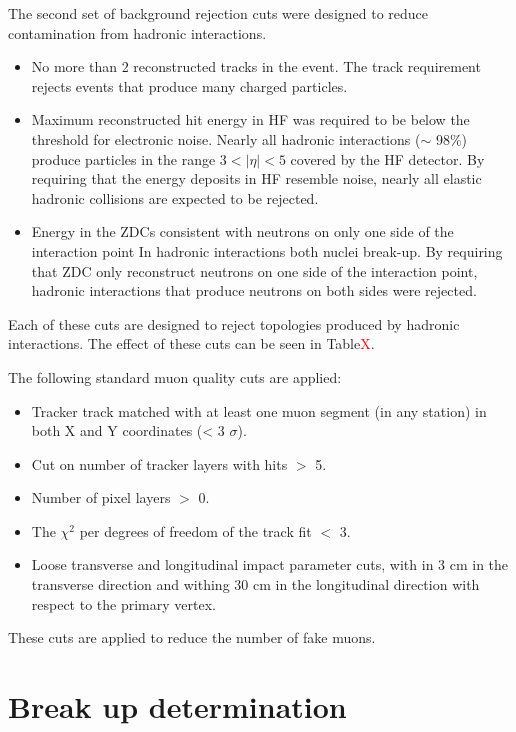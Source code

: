       The second set of background rejection cuts were designed to 
        reduce contamination from hadronic interactions. 
      \begin{itemize}
  	    \item No more than 2 reconstructed tracks in the event.
          The track requirement rejects events that produce many charged 
          particles.
  	    \item Maximum reconstructed hit energy in HF was required to be below 
            the threshold for electronic noise. 
          Nearly all hadronic interactions ($\sim$ 98\%) produce particles in the 
            range $3<|\eta|<5$ covered by the HF detector.
          By requiring that the energy deposits in HF resemble noise, nearly all
            elastic hadronic collisions are expected to be rejected.
  	    \item Energy in the ZDCs consistent with neutrons on only one side 
            of the interaction point
          In hadronic interactions both nuclei break-up. 
          By requiring that ZDC only reconstruct neutrons on one side of the 
            interaction point, hadronic interactions that produce neutrons on both 
            sides were rejected.
      \end{itemize}
      Each of these cuts are designed to reject topologies produced by hadronic
        interactions.
      The effect of these cuts can be seen in Table\textcolor{red}{X}.
  
      The following standard muon quality cuts are applied:
      \begin{itemize}
        \item Tracker track matched with at least one muon segment 
          (in any station) in both X and Y coordinates (< 3 $\sigma$).
        \item Cut on number of tracker layers with hits $>$ 5.
        \item Number of pixel layers $>$ 0.
        \item The $\chi^{2}$ per degrees of freedom of the track fit $<$ 3. 
        \item Loose transverse and longitudinal impact parameter cuts, with in 3 
          cm in the transverse direction and withing 30 cm in the longitudinal 
          direction with respect to the primary vertex.
      \end{itemize}
       These cuts are applied to reduce the number of fake muons.
  
  \section{\label{sec:breakUpDet} Break up determination}
